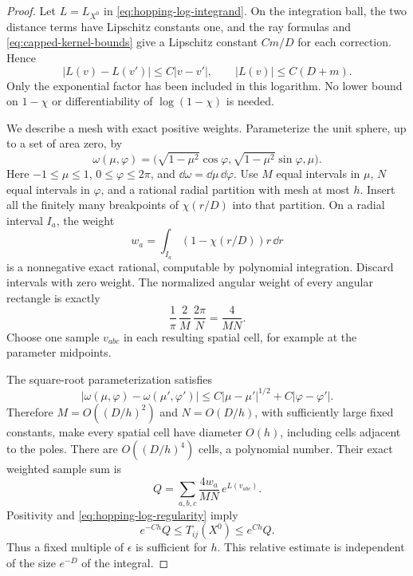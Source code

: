 \begin{proof}
Let $L=L_{X^0}$ in \eqref{eq:hopping-log-integrand}.  On the
integration ball, the two distance terms have Lipschitz constants
one, and the ray formulas and \eqref{eq:capped-kernel-bounds} give
a Lipschitz constant $Cm/D$ for each correction.  Hence
\begin{equation}
 |L(v)-L(v')|\le C|v-v'|,
 \qquad |L(v)|\le C(D+m).
 \label{eq:hopping-log-regularity}
\end{equation}
Only the exponential factor has been included in this logarithm.
No lower bound on $1-\chi$ or differentiability of $\log(1-\chi)$
is needed.

We describe a mesh with exact positive weights.  Parameterize
the unit sphere, up to a set of area zero, by
\[
 \omega(\mu,\varphi)
   =\bigl(\sqrt{1-\mu^2}\cos\varphi,
           \sqrt{1-\mu^2}\sin\varphi,\mu\bigr).
\]
Here $-1\le\mu\le1$, $0\le\varphi\le2\pi$, and
$\dd\omega=\dd\mu\,\dd\varphi$.  Use $M$ equal intervals
in $\mu$, $N$ equal intervals in $\varphi$, and a rational radial
partition with mesh at most $h$.  Insert all the finitely many
breakpoints of $\chi(r/D)$ into that partition.  On a radial
interval $I_a$, the weight
\[
 w_a=\int_{I_a}(1-\chi(r/D))r\,\dd r
\]
is a nonnegative exact rational, computable by polynomial
integration.  Discard intervals with zero weight.  The normalized
angular weight of every angular rectangle is exactly
\begin{equation}
 \frac1\pi\,\frac2M\,\frac{2\pi}{N}=\frac4{MN}.
 \label{eq:exact-angular-weight}
\end{equation}
Choose one sample $v_{abc}$ in each resulting spatial cell, for
example at the parameter midpoints.

The square-root parameterization satisfies
\[
 |\omega(\mu,\varphi)-\omega(\mu',\varphi')|
  \le C|\mu-\mu'|^{1/2}+C|\varphi-\varphi'|.
\]
Therefore $M=O((D/h)^2)$ and $N=O(D/h)$, with sufficiently
large fixed constants, make every spatial cell have diameter
$O(h)$, including cells adjacent to the poles.  There are
$O((D/h)^4)$ cells, a polynomial number.  Their exact weighted
sample sum is
\[
 Q=\sum_{a,b,c}\frac{4w_a}{MN}\,e^{L(v_{abc})}.
\]
Positivity and \eqref{eq:hopping-log-regularity} imply
\begin{equation}
 e^{-Ch}Q\le T_{ij}(X^0)\le e^{Ch}Q.
 \label{eq:positive-quadrature-bracket}
\end{equation}
Thus a fixed multiple of $\epsilon$ is sufficient for $h$.
This relative estimate is independent of the size $e^{-D}$ of
the integral.


\end{proof}
